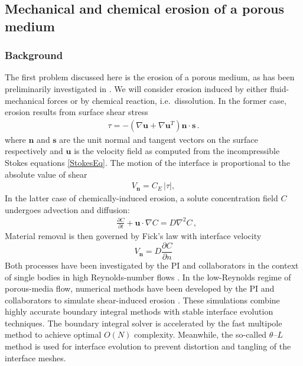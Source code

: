 \documentclass[12pt]{article}
\newcommand{\pd}[2]{ \frac{ \partial #1}{ \partial #2 } }
\newcommand{\bvec}[1]{{\mathbf{#1}}}
\newcommand{\grad}{\nabla}
\newcommand {\Lap} {\grad^2}
\newcommand{\abs}[1]{\left| #1 \right|}
\newcommand{\uu}{\bvec{u}}
\newcommand{\nn}{{\mathbf{n}}}
\renewcommand{\ss}{{\mathbf{s}}}
\newcommand{\Vn}{V_\nn}
\newcommand{\CE}{C_E}
\newcommand {\ny}{n}
\newcommand {\bdry} {\partial B}
\newcommand{\Diff}{D}
\newcommand{\thL}{$\theta$--$L$}
\begin{document}
\subsection{Mechanical and chemical erosion of a porous medium}

\subsubsection{Background}

The first problem discussed here is the erosion of a porous medium, as has been preliminarily investigated in \cite{Quaife2018}. We will consider erosion induced by either fluid-mechanical forces or by chemical reaction, i.e.~dissolution. In the former case, erosion results from surface shear stress
\begin{align}
\tau = -\left(\nabla \uu + \nabla \uu^T \right)\nn \cdot \ss \, .
\end{align}
where $\nn$ and $\ss$ are the unit normal and tangent vectors on the surface respectively and $\uu$ is the velocity field as computed from the incompressible Stokes equations \eqref{StokesEq}. 
The motion of the interface is proportional to the absolute value of shear
\begin{align}
\Vn = \CE \, \abs{\tau},
\end{align}
In the latter case of chemically-induced erosion, a solute concentration field $C$ undergoes advection and diffusion:
\begin{align}
\label{Ceq}
& \pd{C}{t} + \uu \cdot \grad C = \Diff \Lap C \, ,
\end{align}
Material removal is then governed by Fick's law with interface velocity
\begin{equation}
\label{DissVn}
\Vn = \left. \Diff \pd{C}{\ny} \right. %
\end{equation}
Both processes have been investigated by the PI and collaborators in the context of single bodies in high Reynolds-number flows \cite{Ristroph2012, MoorePOF2013, HuangJFM2015, MooreCPAM2017}. In the low-Reynolds regime of porous-media flow, numerical methods have been developed by the PI and collaborators to simulate shear-induced erosion \cite{Quaife2018}. These simulations combine highly accurate boundary integral methods with stable interface evolution techniques. The boundary integral solver is accelerated by the fast multipole method \cite{gre-rok1987, gre-gre-may1992} to achieve optimal $O(N)$ complexity. Meanwhile, the so-called {\thL} method is used for interface evolution to prevent distortion and tangling of the interface meshes.
\end{document}
